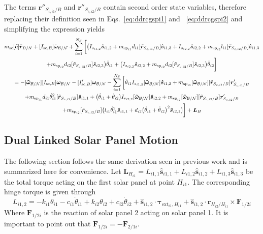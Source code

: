 \documentclass[paper]{aiaaNew}
\begin{document}
	The terms $\bm{r}''_{S_{c,i1}/B}$ and $\bm{r}''_{S_{c,i2}/B}$ contain second order state variables, therefore replacing their definition seen in Eqs.~\eqref{eq:ddrcgspi1} and ~\eqref{eq:ddrcgspi2} and simplifying the expression yields
	\begin{multline}
	m_{\text{sc}} [\tilde{\bm{c}}] \ddot{\bm r}_{B/N} + [I_{\text{sc},B}] \dot{\bm\omega}_{\cal B/N} + \sum\limits_{i=1}^{N_S} \bigg[  \big(I_{s_{i1,2}}\bm{\hat{s}}_{i1,2}+m_{\text{sp}_{i1}}d_{i1} [\tilde{\bm{r}}_{S_{c,i1}/B}]   \bm{\hat{s}}_{i1,3} + I_{s_{i2,2}}\bm{\hat{s}}_{i2,2}
	+m_{\text{sp}_{i2}}l_{i1} [\tilde{\bm{r}}_{S_{c,i2}/B}]  \bm{\hat{s}}_{i1,3}\\
	+m_{\text{sp}_{i2}}d_{i2} [\tilde{\bm{r}}_{S_{c,i2}/B}] \bm{\hat{s}}_{i2,3}\big) \ddot{\theta}_{i1}
	+\big( I_{s_{i2,2}}\bm{\hat{s}}_{i2,2}+m_{\text{sp}_{i2}} d_{i2} [\tilde{\bm{r}}_{S_{c,i2}/B}] \bm{\hat{s}}_{i2,3}\big)\ddot{\theta}_{i2}\bigg] 
	\\
	= -[\bm{\tilde{\omega}}_{\cal B/N}] [I_{\text{sc},B}] \bm\omega_{\cal B/N} - [I'_{\text{sc},B}] \bm\omega_{\cal B/N} 
	-  \sum\limits_{i=1}^{N_S} \bigg[
	\dot{\theta}_{i1} I_{s_{i1,2}} [\bm{\tilde{\omega}}_{\cal B/N}] \bm{\hat{s}}_{i1,2} 
	+m_{\text{sp}_{i1}} [\bm{\tilde{\omega}}_{\cal B/N}] [\tilde{\bm{r}}_{S_{c,i1}/B}] \bm{r}'_{S_{c,i1}/B} \\
	+m_{\text{sp}_{i1}}d_{i1}\dot{\theta}_{i1}^2  [\tilde{\bm{r}}_{S_{c,i1}/B}] \bm{\hat{s}}_{i1,1}
	+ \big(\dot{\theta}_{i1}+\dot{\theta}_{i2}\big) I_{s_{i2,2}}[\bm{\tilde{\omega}}_{\cal B/N}]\bm{\hat{s}}_{i2,2}
	+m_{\text{sp}_{i2}} [\bm{\tilde{\omega}}_{\cal B/N}] [\tilde{\bm{r}}_{S_{c,i2}/B}] \bm{r}'_{S_{c,i2}/B} \\
	+m_{\text{sp}_{i2}} [\tilde{\bm{r}}_{S_{c,i2}/B}] \big(l_{i1} \dot{\theta}_{i1}^2 \bm{\hat{s}}_{i1,1} + d_{i2}\big(\dot{\theta}_{i1} + \dot{\theta}_{i2}\big)^2\bm{\hat{s}}_{i2,1}\big)\bigg]
	+ \bm{L}_B 
	\label{eq:Final6}
	\end{multline}
	
	
	\subsection{Dual Linked Solar Panel Motion}
	
	The following section follows the same derivation seen in previous work\cite{Allard2016rz} and is summarized here for convenience. 
	Let $\bm L_{H_{i1}} = L_{i1,1} \hat{\bm s}_{i1,1} + L_{i1,2} \hat{\bm s}_{i1,2} + L_{i1,3} \hat{\bm s}_{i1,3}$ be the total torque acting on the first solar panel at point $H_{i1}$. The corresponding hinge torque is given through
	\begin{equation}
	L_{i1,2} = - k_{i1} \theta_{i1} - c_{i1}\dot{\theta}_{i1} +  k_{i2} \theta_{i2} + c_{i2} \dot\theta_{i2} + \hat{\bm s}_{i1,2} \cdot \bm \tau_{\text{ext}_{i1},H_{i1}} + \hat{\bm s}_{i1,2} \cdot \bm{r}_{H_{i2}/H_{i1}} \times \bm F_{1/2i}
	\label{eq:hingeTorque1}
	\end{equation}
	Where $\bm F_{1/2i}$ is the reaction of solar panel 2 acting on solar panel 1. It is important to point out that $\bm F_{1/2i} = - \bm F_{2/1i}$. 
	
\end{document}
